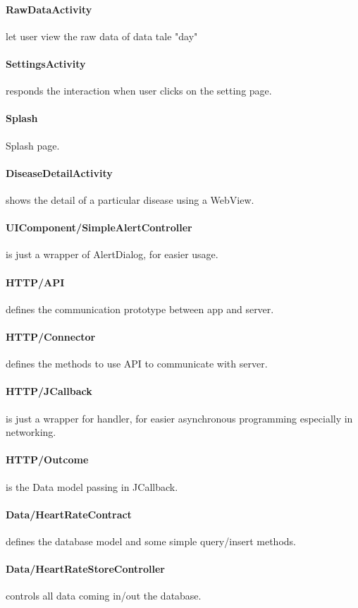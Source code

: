\documentclass[10pt,a4paper,final]{scrartcl}
\begin{document}
\paragraph{RawDataActivity} let user view the raw data of data tale "day"
\paragraph{SettingsActivity} responds the interaction when user clicks on the setting page.
\paragraph{Splash} Splash page.
\paragraph{DiseaseDetailActivity} shows the detail of a particular disease using a WebView.
\paragraph{UIComponent/SimpleAlertController} is just a wrapper of AlertDialog, for easier usage.
\paragraph{HTTP/API} defines the communication prototype between app and server.
\paragraph{HTTP/Connector} defines the methods to use API to communicate with server.
\paragraph{HTTP/JCallback} is just a wrapper for handler, for easier asynchronous programming especially in networking.
\paragraph{HTTP/Outcome} is the Data model passing in JCallback.
\paragraph{Data/HeartRateContract} defines the database model and some simple query/insert methods.
\paragraph{Data/HeartRateStoreController} controls all data coming in/out the database.
\end{document}
